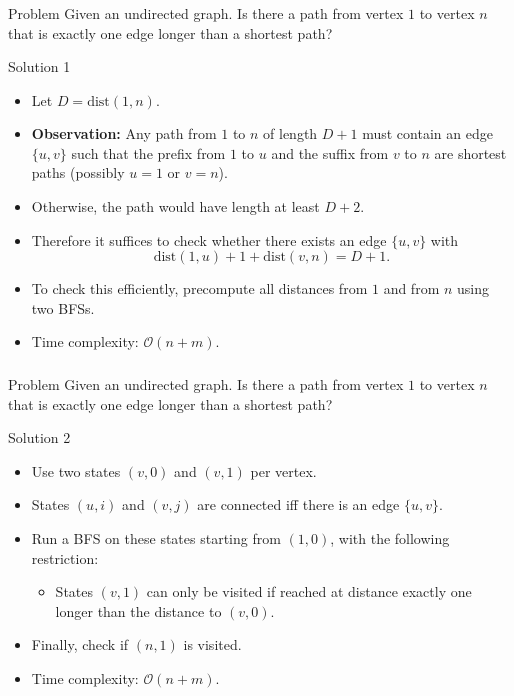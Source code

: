 \begin{frame}
	\frametitle{\problemtitle}
	\begin{block}{Problem}
		Given an undirected graph.
		Is there a path from vertex $1$ to vertex $n$ that is exactly one edge longer than a shortest path?
	\end{block}

	\pause
	\begin{block}{Solution 1}
		\begin{itemize}
			\item Let $D = \mathrm{dist}(1, n)$.
			\item \textbf{Observation:} Any path from $1$ to $n$ of length $D + 1$ must contain an edge $\{u, v\}$ such that the prefix from $1$ to $u$ and the suffix from $v$ to $n$ are shortest paths (possibly $u = 1$ or $v = n$).
			\item Otherwise, the path would have length at least $D + 2$.
			\pause
			\item Therefore it suffices to check whether there exists an edge $\{u, v\}$ with
			$$ \mathrm{dist}(1, u) + 1 + \mathrm{dist}(v, n) = D + 1.$$
			\item To check this efficiently, precompute all distances from $1$ and from $n$ using two BFSs.
			\item Time complexity: $\mathcal O(n + m)$.
		\end{itemize}
	\end{block}
\end{frame}

\begin{frame}
	\frametitle{\problemtitle}
	\begin{block}{Problem}
		Given an undirected graph.
		Is there a path from vertex $1$ to vertex $n$ that is exactly one edge longer than a shortest path?
	\end{block}

	\begin{block}{Solution 2}
		\begin{itemize}
			\item Use two states $(v, 0)$ and $(v, 1)$ per vertex.
			\item States $(u, i)$ and $(v, j)$ are connected iff there is an edge $\{u, v\}$.
			\pause
			\item Run a BFS on these states starting from $(1, 0)$, with the following restriction:
			\begin{itemize}
				\item States $(v, 1)$ can only be visited if reached at distance exactly one longer than the distance to $(v, 0)$.
			\end{itemize}
			\pause
			\item Finally, check if $(n, 1)$ is visited.
			\item Time complexity: $\mathcal O(n + m)$.
		\end{itemize}
	\end{block}
\end{frame}
